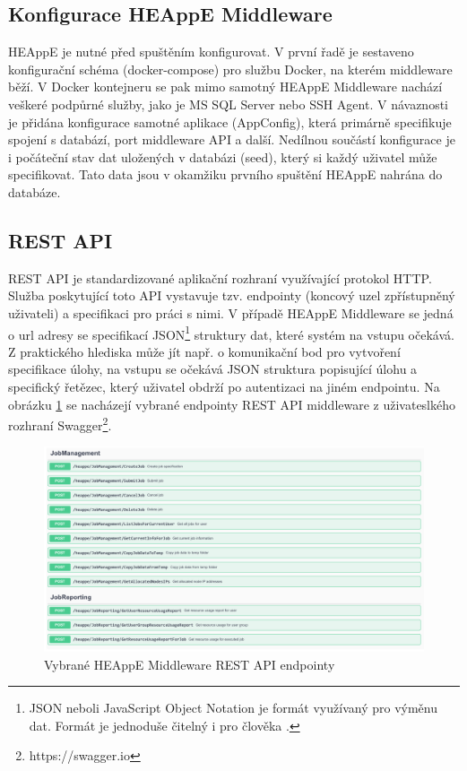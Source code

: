 \subsection{Konfigurace HEAppE Middleware}
HEAppE je nutné před spuštěním konfigurovat. V první řadě je sestaveno konfigurační schéma (docker-compose) pro službu Docker, na kterém middleware běží. V Docker kontejneru se pak mimo samotný HEAppE Middleware nachází veškeré podpůrné služby, jako je MS SQL Server nebo SSH Agent. V návaznosti je přidána konfigurace samotné aplikace (AppConfig), která primárně specifikuje spojení s databází, port middleware API a další. Nedílnou součástí konfigurace je i počáteční stav dat uložených v databázi (seed), který si každý uživatel může specifikovat. Tato data jsou v okamžiku prvního spuštění HEAppE nahrána do databáze.

\subsection{REST API}
REST API je standardizované aplikační rozhraní využívající protokol HTTP. Služba poskytující toto API vystavuje tzv. endpointy (koncový uzel zpřístupněný uživateli) a specifikaci pro práci s nimi. V případě HEAppE Middleware se jedná o url adresy se specifikací JSON\footnote{JSON neboli JavaScript Object Notation je formát využívaný pro výměnu dat. Formát je jednoduše čitelný i pro člověka \cite{lJoeVuQg92zsjaAe}.} struktury dat, které systém na vstupu očekává. Z praktického hlediska může jít např. o komunikační bod pro vytvoření specifikace úlohy, na vstupu se očekává JSON struktura popisující úlohu a specifický řetězec, který uživatel obdrží po autentizaci na jiném endpointu. Na obrázku \ref{fig:swagger} se nacházejí vybrané endpointy REST API middleware z uživateslkého rozhraní Swagger\footnote{https://swagger.io}.


\begin{figure}
	\centering
	\includegraphics[width=1\textwidth]{Figures/swagger-ui.pdf}
	\caption{Vybrané HEAppE Middleware REST API endpointy}
	\label{fig:swagger}
\end{figure}

